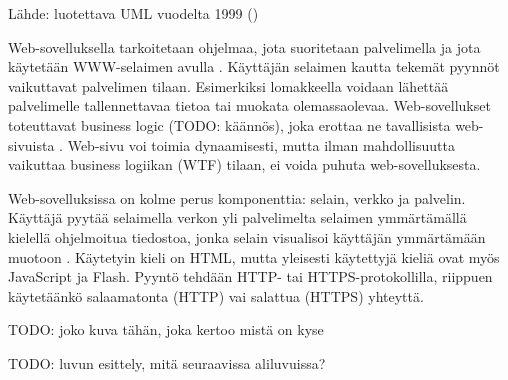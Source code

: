 Lähde: luotettava UML vuodelta 1999 (\cite{uml})

Web-sovelluksella tarkoitetaan ohjelmaa, jota suoritetaan palvelimella ja jota käytetään WWW-selaimen avulla \cite{uml}. Käyttäjän selaimen kautta tekemät pyynnöt vaikuttavat palvelimen tilaan. Esimerkiksi lomakkeella voidaan lähettää palvelimelle tallennettavaa tietoa tai muokata olemassaolevaa. Web-sovellukset toteuttavat business logic (TODO: käännös), joka erottaa ne tavallisista web-sivuista \cite{uml}. Web-sivu voi toimia dynaamisesti, mutta ilman mahdollisuutta vaikuttaa business logiikan (WTF) tilaan, ei voida puhuta web-sovelluksesta.

Web-sovelluksissa on kolme perus komponenttia: selain, verkko ja palvelin. Käyttäjä pyytää selaimella verkon yli palvelimelta selaimen ymmärtämällä kielellä ohjelmoitua tiedostoa, jonka selain visualisoi käyttäjän ymmärtämään muotoon \cite{uml}. Käytetyin kieli on HTML, mutta yleisesti käytettyjä kieliä ovat myös JavaScript ja Flash. Pyyntö tehdään HTTP- tai HTTPS-protokollilla, riippuen käytetäänkö salaamatonta (HTTP) vai salattua (HTTPS) yhteyttä.

TODO: joko kuva tähän, joka kertoo mistä on kyse

TODO: luvun esittely, mitä seuraavissa aliluvuissa?